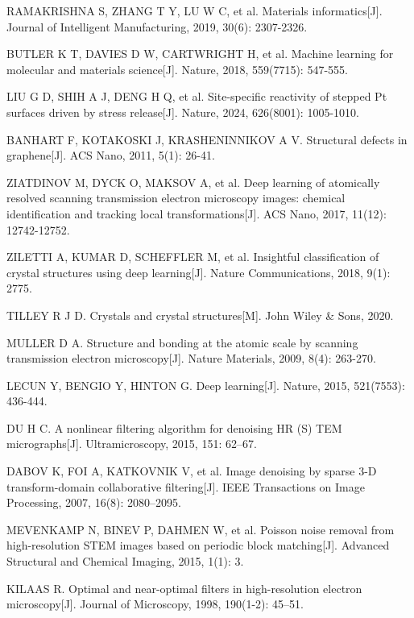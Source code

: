 RAMAKRISHNA S, ZHANG T Y, LU W C, et al. Materials informatics[J]. Journal of Intelligent Manufacturing, 2019, 30(6): 2307-2326.

BUTLER K T, DAVIES D W, CARTWRIGHT H, et al. Machine learning for molecular and materials science[J]. Nature, 2018, 559(7715): 547-555.

LIU G D, SHIH A J, DENG H Q, et al. Site-specific reactivity of stepped Pt surfaces driven by stress release[J]. Nature, 2024, 626(8001): 1005-1010.

BANHART F, KOTAKOSKI J, KRASHENINNIKOV A V. Structural defects in graphene[J]. ACS Nano, 2011, 5(1): 26-41.

ZIATDINOV M, DYCK O, MAKSOV A, et al. Deep learning of atomically resolved scanning transmission electron microscopy images: chemical identification and tracking local transformations[J]. ACS Nano, 2017, 11(12): 12742-12752.

ZILETTI A, KUMAR D, SCHEFFLER M, et al. Insightful classification of crystal structures using deep learning[J]. Nature Communications, 2018, 9(1): 2775.

TILLEY R J D. Crystals and crystal structures[M]. John Wiley \& Sons, 2020.

MULLER D A. Structure and bonding at the atomic scale by scanning transmission electron microscopy[J]. Nature Materials, 2009, 8(4): 263-270.

LECUN Y, BENGIO Y, HINTON G. Deep learning[J]. Nature, 2015, 521(7553): 436-444.

DU H C. A nonlinear filtering algorithm for denoising HR (S) TEM micrographs[J]. Ultramicroscopy, 2015, 151: 62--67.

DABOV K, FOI A, KATKOVNIK V, et al. Image denoising by sparse 3-D transform-domain collaborative filtering[J]. IEEE Transactions on Image Processing, 2007, 16(8): 2080--2095.

MEVENKAMP N, BINEV P, DAHMEN W, et al. Poisson noise removal from high-resolution STEM images based on periodic block matching[J]. Advanced Structural and Chemical Imaging, 2015, 1(1): 3.

KILAAS R. Optimal and near-optimal filters in high-resolution electron microscopy[J]. Journal of Microscopy, 1998, 190(1-2): 45--51.

